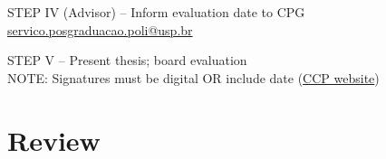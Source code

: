 \documentclass[normalnum]{politex}
\newcommand{\cmark}{\ding{51}}%
\newcommand{\xmark}{\ding{55}}%
\newcommand{\done}{\rlap{$\square$}{\raisebox{2pt}{\large\hspace{1pt}\cmark}}%
\hspace{-2.5pt}}
\newcommand{\wontfix}{\rlap{$\square$}{\large\hspace{1pt}\xmark}}
\begin{document}
\begin{todolist}
\begin{itemize}
\end{itemize}

\item[\done] STEP IV (Advisor) -- Inform evaluation date to CPG \url{servico.posgraduacao.poli@usp.br}

\item[\done] STEP V -- Present thesis; board evaluation
\\NOTE: Signatures must be digital OR include date (\href{https://ppgee.poli.usp.br/pb/formularios/}{CCP website})

\end{todolist}

\newpage
\section*{Review}
\begin{todolist}%


\end{todolist}
\end{document}
